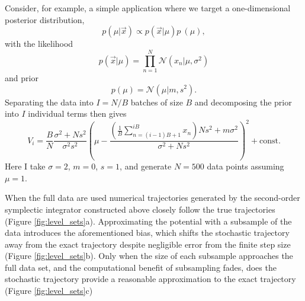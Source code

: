 \documentclass{article}
\begin{document}
Consider, for example, a simple application where we target a one-dimensional
posterior distribution,
%
\begin{equation} \label{posterior}
p \! \left( \mu | \vec{x} \right) \propto p \! \left( \vec{x} | \mu \right) p\ \! \left( \mu \right),
\end{equation}
%
with the likelihood
%
\begin{equation*}
p \! \left( \vec{x} | \mu \right) = \prod_{n = 1}^{N} \mathcal{N} \! \left( x_{n} | \mu, \sigma^{2} \right)
\end{equation*}
%
and prior
%
\begin{equation*}
p \! \left( \mu \right) = \mathcal{N} \! \left( \mu | m, s^{2} \right). 
\end{equation*}
%
Separating the data into $I = N / B$ batches of size $B$ and decomposing the
prior into $I$ individual terms then gives
%
\begin{equation*}
V_{i} = 
\frac{B}{N} \frac{ \sigma^{2} + N s^{2}  }{ \sigma^{2} s^{2} }
\left( \mu - 
\frac{ \left( \frac{1}{B} \sum_{n = (i - 1) B + 1}^{i B} x_{n} \right) N s^{2}  + m \sigma^{2} }
{ \sigma^{2} + N s^{2} } 
\right)^{2} + \mathrm{const}.
\end{equation*}
%
Here I take $\sigma = 2$, $m = 0$, $s = 1$, and generate $N = 500$ data points
assuming $\mu = 1$.

When the full data are used numerical trajectories generated by the second-order 
symplectic integrator constructed above closely follow the true trajectories 
(Figure \ref{fig:level_sets}a).  Approximating the potential with a subsample of the data 
introduces the aforementioned bias, which shifts the stochastic trajectory away from the 
exact trajectory despite negligible error from the finite step size (Figure \ref{fig:level_sets}b).
Only when the size of each subsample approaches the full data set, and the computational
benefit of subsampling fades, does the stochastic trajectory provide a reasonable
approximation to the exact trajectory (Figure \ref{fig:level_sets}c)
\end{document}
